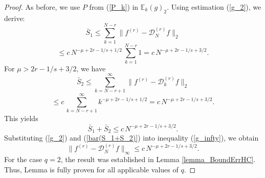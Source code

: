 \documentclass[10pt,a4paper]{amsart}
\begin{document}
\begin{proof}
As before, we use $P$ from (\ref{P_k}) in $\mathbb{E}_k(g)_{2}$.
Using estimation (\ref{g_2}), we derive:
$$
\bar{S}_1 \le \sum_{k=1}^{N-r} \|f^{(r)}-\mathcal{D}_N^{(r)} f\|_{2}
$$
$$
\le c\, N^{-\mu+2r-1/s+1/2}\, \sum_{k=1}^{N-r}  1
= c\, N^{-\mu+2r-1/s+3/2} .
$$
For $\mu>2r-1/s+3/2$, we have
$$
\bar{S}_2 \le \sum_{k=N-r+1}^{\infty}  \|f^{(r)}-\mathcal{D}_k^{(r)} f\|_{2}
$$
$$
\le c\, \sum_{k=N-r+1}^{\infty}  k^{-\mu+2r-1/s+1/2}
= c\, N^{-\mu+2r-1/s+3/2} .
$$
This yields
\begin{equation}   \label{bar(S_1+S_2)}
\bar{S}_1+\bar{S}_2 \le c\, N^{-\mu+2r-1/s+3/2} .
\end{equation}
Substituting (\ref{g_2}) and (\ref{bar(S_1+S_2)}) into inequality (\ref{g_infty}), we obtain
$$
\|f^{(r)}-\mathcal{D}_N^{(r)} f\|_{\infty} \leq
c\, N^{-\mu+2r-1/s+3/2} .
$$
For the case $q=2$, the result was established in Lemma \ref{lemma_BoundErrHC}. \\
Thus, Lemma is fully proven for all applicable values of $q$.
\end{proof}
\end{document}
